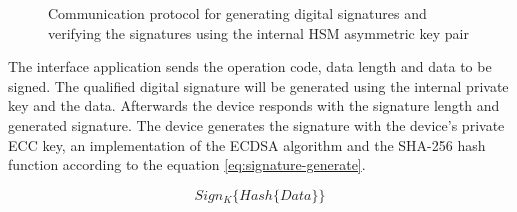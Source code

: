 \begin{figure}[h!]
	\centering     %
	\caption{Communication protocol for generating digital signatures and verifying the signatures using the internal HSM asymmetric key pair}
\end{figure}

The interface application sends the operation code, data length and data to be signed.
The qualified digital signature will be generated using the internal private key and the data. Afterwards the device responds with the signature length and generated signature.
The device generates the signature with the device's private \ac{ECC} key, an implementation of the \ac{ECDSA} algorithm and the \ac{SHA}-256 hash function according to the equation \ref{eq:signature-generate}.

\begin{equation}
	\label{eq:signature-generate}
	Sign_{K}\{Hash\{Data\}\}
\end{equation}

